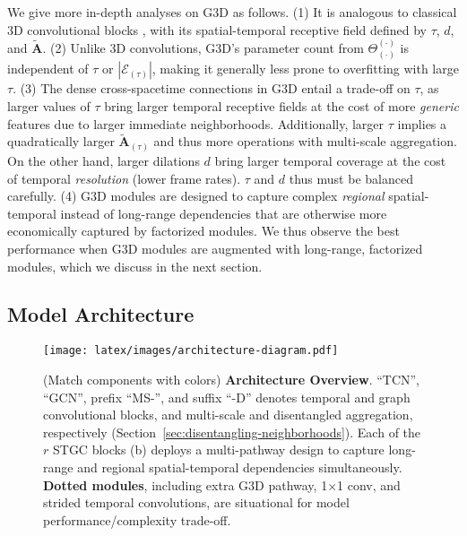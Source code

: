 \documentclass[10pt,twocolumn,letterpaper]{article}
\makeatletter
\renewcommand{\paragraph}{\@startsection{paragraph}{4}{\z@}{1.5ex \@plus 1ex \@minus .2ex}{-1em}{\normalfont\normalsize\bfseries}}
\makeatother
\begin{document}
\paragraph{Discussion.}
We give more in-depth analyses on G3D as follows.
(1) It is analogous to classical 3D convolutional blocks \cite{3d-conv-original}, with its spatial-temporal receptive field defined by $\tau$, $d$, and $\tilde{\mathbf{A}}$.
(2) Unlike 3D convolutions, G3D's parameter count from $\Theta_{(\cdot)}^{(\cdot)}$ is independent of $\tau$ or $|\mathcal{E}_{(\tau)}|$, making it generally less prone to overfitting with large $\tau$.
(3) The dense cross-spacetime connections in G3D entail a trade-off on $\tau$, as larger values of $\tau$ bring larger temporal receptive fields at the cost of more \textit{generic} features due to larger immediate neighborhoods. Additionally, larger $\tau$ implies a quadratically larger $\tilde{\mathbf{A}}_{(\tau)}$ and thus more operations with multi-scale aggregation.
On the other hand, larger dilations $d$ bring larger temporal coverage at the cost of temporal \textit{resolution} (lower frame rates). $\tau$ and $d$ thus must be balanced carefully.
(4) G3D modules are designed to capture complex \textit{regional} spatial-temporal instead of long-range dependencies that are otherwise more economically captured by factorized modules. We thus observe the best performance when G3D modules are augmented with long-range, factorized modules, which we discuss in the next section.












\subsection{Model Architecture}

\begin{figure*}[h]
\texttt{[image: latex/images/architecture-diagram.pdf]}
   \caption{(Match components with colors) \textbf{Architecture Overview}. ``TCN'', ``GCN'', prefix ``MS-'', and suffix ``-D'' denotes temporal and graph convolutional blocks, and multi-scale and disentangled aggregation, respectively (Section~\ref{sec:disentangling-neighborhoods}). Each of the $r$ STGC blocks (b) deploys a multi-pathway design to capture long-range and regional spatial-temporal dependencies simultaneously.
   \textbf{Dotted modules}, including extra G3D pathway, 1$\times$1 conv, and strided temporal convolutions, are situational for model performance/complexity trade-off.
    }
\label{fig:architecture}
\end{figure*}
\end{document}
